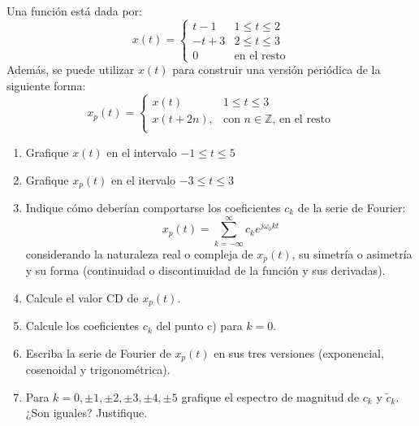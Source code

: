 \begin{ejercicio}
    Una función está dada por:
    $$
    x(t) = \left\{
    \begin{array}{ll}
        t-1     & 1 \leq t \leq 2\\
        -t+3    & 2 \leq t \leq 3\\
        0       & \text{en el resto}
    \end{array}
    \right.
    $$
    Además, se puede utilizar $x(t)$ para construir una versión periódica de la siguiente forma:
    $$
    x_p(t) = \left\{
    \begin{array}{ll}
        x(t)     & 1 \leq t \leq 3\\
        x(t+2n),    & \text{con } n\in\mathbb{Z} \text{, en el resto}\\
    \end{array}
    \right.
    $$
    \begin{enumerate}
        \item Grafique $x(t)$ en el intervalo $-1 \leq t \leq 5$
        \item Grafique $x_p(t)$ en el itervalo $-3 \leq t \leq 3$
        \item Indique cómo deberían comportarse los coeficientes $c_k$ de la serie de Fourier:
            $$ x_p(t) = \sum_{k=-\infty}^{\infty} c_k e^{j\omega_0 kt} $$
        considerando la naturaleza real o compleja de $x_p(t)$, su simetría o asimetría y su forma (continuidad o discontinuidad de la función y sus derivadas).
        \item Calcule el valor CD de $x_p(t)$.
        \item Calcule los coeficientes $c_k$ del punto c) para $k=0$.
        \item Escriba la serie de Fourier de $x_p(t)$ en sus tres versiones (exponencial, cosenoidal y trigonométrica).
        \item Para $k=0,\pm 1, \pm 2, \pm 3, \pm 4, \pm 5$ grafique el espectro de magnitud de $c_k$ y $\tilde{c}_k$. ¿Son iguales? Justifique. 
    \end{enumerate}
\end{ejercicio}

